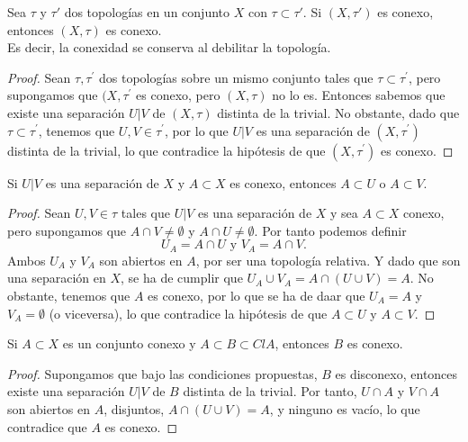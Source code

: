 \begin{proposición}
    Sea $\tau$ y $\tau'$ dos topologías en un conjunto $X$ con $\tau \subset \tau'$. Si $(X, \tau')$ es conexo, entonces $(X, \tau)$ es conexo. \\
    Es decir, la conexidad se conserva al debilitar la topología.
\end{proposición}
\begin{proof}
    Sean $\tau, \tau^{\prime}$ dos topologías sobre un mismo conjunto tales que $\tau \subset \tau^{\prime}$, pero supongamos que $(X, \tau^{\prime}$ es conexo, pero $(X, \tau)$ no lo es. Entonces sabemos que existe una separación $U|V$ de $(X, \tau)$ distinta de la trivial. No obstante, dado que $\tau \subset \tau^{\prime}$, tenemos que $U, V \in \tau^{\prime}$, por lo que $U|V$ es una separación de $(X, \tau^{\prime})$ distinta de la trivial, lo que contradice la hipótesis de que $(X, \tau^{\prime})$ es conexo.
\end{proof}
\begin{proposición}
    Si $U|V$ es una separación de $X$ y $A \subset X$ es conexo, entonces $A \subset U$ o $A \subset V$.
\end{proposición}
\begin{proof}
    Sean $U, V \in \tau$ tales que $U|V$ es una separación de $X$ y sea $A \subset X$ conexo, pero supongamos que $A \cap V \neq \emptyset$ y $A \cap U \neq \emptyset$. Por tanto podemos definir 
    $$U_A = A \cap U \text{ y } V_A = A \cap V.$$
    Ambos $U_A$ y $V_A$ son abiertos en $A$, por ser una topología relativa. Y dado que son una separación en $X$, se ha de cumplir que $U_A \cup V_A = A \cap (U \cup V) = A$. No obstante, tenemos que $A$ es conexo, por lo que se ha de daar que $U_A = A$ y $V_A = \emptyset$ (o viceversa), lo que contradice la hipótesis de que $A \subset U$ y $A \subset V$.
\end{proof}
\begin{proposición}
    Si $A \subset X$ es un conjunto conexo y $A \subset B \subset Cl{A}$, entonces $B$ es conexo.
\end{proposición}
\begin{proof}
    Supongamos que bajo las condiciones propuestas, $B$ es disconexo, entonces existe una separación $U|V$ de $B$ distinta de la trivial. Por tanto, $U \cap A$ y $V \cap A$ son abiertos en $A$, disjuntos, $A \cap (U \cup V) = A$, y ninguno es vacío, lo que contradice que $A$ es conexo.
\end{proof}
